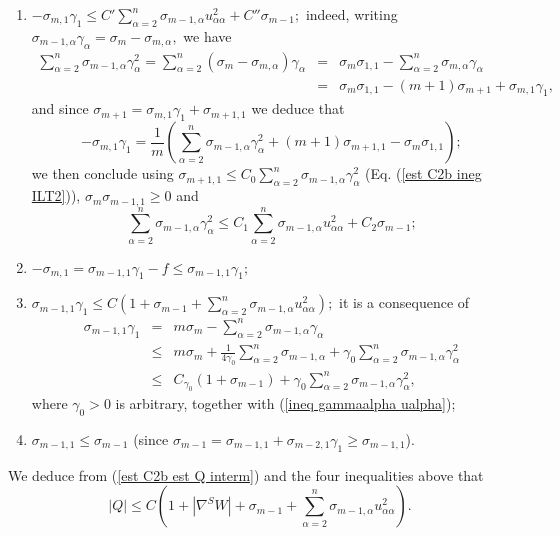 \documentclass[10pt,reqno,oneside]{amsart}
\theoremstyle{definition}
\theoremstyle{remark}
\begin{document}
\begin{enumerate}
\item $-\sigma_{m,1}\gamma_1\leq C'\sum_{\alpha=2}^n\sigma_{m-1,\alpha}u_{\alpha\alpha}^2+C''\sigma_{m-1};$ indeed, writing $\sigma_{m-1,\alpha}\gamma_{\alpha}=\sigma_m-\sigma_{m,\alpha},$ we have
\begin{eqnarray*}
\sum_{\alpha=2}^n\sigma_{m-1,\alpha}\gamma_\alpha^2=\sum_{\alpha=2}^n(\sigma_m-\sigma_{m,\alpha})\gamma_\alpha&=&\sigma_m\sigma_{1,1}-\sum_{\alpha=2}^n\sigma_{m,\alpha}\gamma_\alpha\\
&=&\sigma_m\sigma_{1,1}-(m+1)\sigma_{m+1}+\sigma_{m,1}\gamma_1,
\end{eqnarray*}
and since $\sigma_{m+1}=\sigma_{m,1}\gamma_1+\sigma_{m+1,1}$ we deduce that
$$-\sigma_{m,1}\gamma_1=\frac{1}{m}\left(\sum_{\alpha=2}^n\sigma_{m-1,\alpha}\gamma_\alpha^2+(m+1)\sigma_{m+1,1}-\sigma_m\sigma_{1,1}\right);$$
we then conclude using $\sigma_{m+1,1}\leq C_0\sum_{\alpha=2}^n\sigma_{m-1,\alpha}\gamma_\alpha^2$ (Eq. (\ref{est C2b ineg ILT2})), $\sigma_m\sigma_{m-1,1}\geq 0$ and
\begin{equation}\label{ineq gammaalpha ualpha}
\sum_{\alpha=2}^n\sigma_{m-1,\alpha}\gamma_\alpha^2\leq C_1\sum_{\alpha=2}^n\sigma_{m-1,\alpha}u_{\alpha\alpha}^2+C_2\sigma_{m-1};
\end{equation}
\item $-\sigma_{m,1}=\sigma_{m-1,1}\gamma_1-f\leq \sigma_{m-1,1}\gamma_1;$
\item $\sigma_{m-1,1}\gamma_1\leq C(1+\sigma_{m-1}+\sum_{\alpha=2}^n\sigma_{m-1,\alpha}u_{\alpha\alpha}^2);$ it is a consequence of
\begin{eqnarray}
\sigma_{m-1,1}\gamma_1&=&m\sigma_m-\sum_{\alpha=2}^n\sigma_{m-1,\alpha}\gamma_{\alpha}\nonumber\\
&\leq&m\sigma_m+\frac{1}{4\gamma_0}\sum_{\alpha=2}^n\sigma_{m-1,\alpha}+\gamma_0\sum_{\alpha=2}^n\sigma_{m-1,\alpha}\gamma_\alpha^2\nonumber\\
&\leq&C_{\gamma_0}(1+\sigma_{m-1})+\gamma_0\sum_{\alpha=2}^n\sigma_{m-1,\alpha}\gamma_\alpha^2,\label{est sigma m-11gamma1}
\end{eqnarray}
where $\gamma_0>0$ is arbitrary, together with (\ref{ineq gammaalpha ualpha});
\item $\sigma_{m-1,1}\leq \sigma_{m-1}$ (since $\sigma_{m-1}=\sigma_{m-1,1}+\sigma_{m-2,1}\gamma_1\geq \sigma_{m-1,1}$).
\end{enumerate}
We deduce from (\ref{est C2b est Q interm}) and the four inequalities above that
\begin{equation}\label{est C2b eqn est Q 3}
|Q|\leq C\left(1+|\nabla^S W|+\sigma_{m-1}+\sum_{\alpha=2}^n\sigma_{m-1,\alpha}u_{\alpha\alpha}^2\right).
\end{equation}
\end{document}
